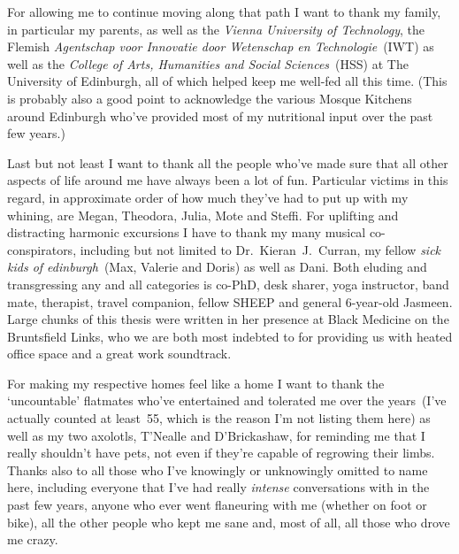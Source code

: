 \documentclass[oneside]{book}
\begin{document}
For allowing me to continue moving along that path I want to thank my family, in particular my parents, as well as the \emph{Vienna University of Technology}, the Flemish \emph{Agentschap voor Innovatie door Wetenschap en Technologie}~(IWT) as well as the \emph{College of Arts, Humanities and Social Sciences}~(HSS) at The University of Edinburgh, all of which helped keep me well-fed all this time. (This is probably also a good point to acknowledge the various Mosque Kitchens around Edinburgh who've provided most of my nutritional input over the past few years.)

Last but not least I want to thank all the people who've made sure that all other aspects of life around me have always been a lot of fun. Particular victims in this regard, in approximate order of how much they've had to put up with my whining, are Megan, Theodora, Julia, Mote and Steffi.
For uplifting and distracting harmonic excursions I have to thank my many musical co-conspirators, including but not limited to Dr.~Kieran~J.~Curran, my fellow \emph{sick kids of edinburgh}~(Max, Valerie and Doris) as well as Dani.
Both eluding and transgressing any and all categories is co-PhD, desk sharer, yoga instructor, band mate, therapist, travel companion, fellow SHEEP and general 6-year-old Jasmeen. Large chunks of this thesis were written in her presence at Black Medicine on the Bruntsfield Links, who we are both most indebted to for providing us with heated office space and a great work soundtrack.

For making my respective homes feel like a home I want to thank the `uncountable' flatmates who've entertained and tolerated me over the years~(I've actually counted at least~55, which is the reason I'm not listing them here) as well as my two axolotls, T'Nealle and D'Brickashaw, for reminding me that I really shouldn't have pets, not even if they're capable of regrowing their limbs. %
Thanks also to all those who I've knowingly or unknowingly omitted to name here, including everyone that I've had really \emph{intense} conversations with in the past few years, anyone who ever went flaneuring with me (whether on foot or bike), all the other people who kept me sane and, most of all, all those who drove me crazy.
\end{document}
